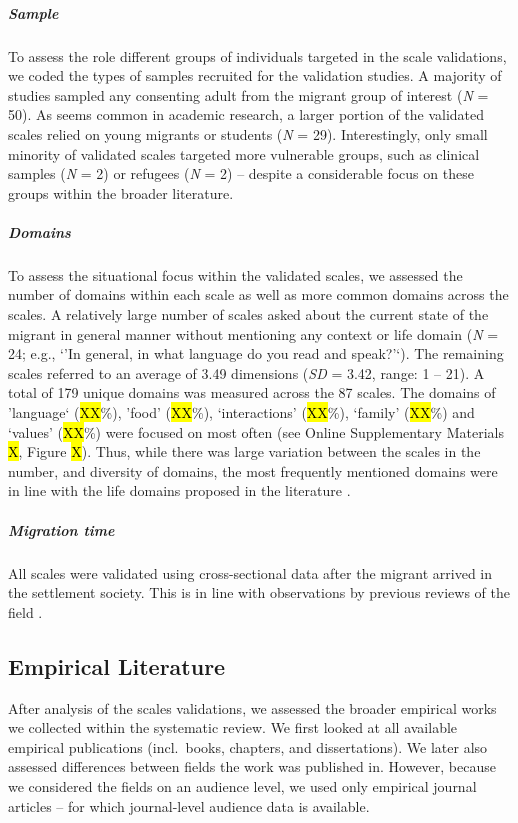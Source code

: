 \subparagraph{Sample}

To assess the role different groups of individuals targeted in the scale
validations, we coded the types of samples recruited for the validation
studies. A majority of studies sampled any consenting adult from the
migrant group of interest (\textit{N} = 50). As seems common in academic
research, a larger portion of the validated scales relied on young
migrants or students (\textit{N} = 29). Interestingly, only small
minority of validated scales targeted more vulnerable groups, such as
clinical samples (\textit{N} = 2) or refugees (\textit{N} = 2) --
despite a considerable focus on these groups within the broader
literature.

\subparagraph{Domains}

To assess the situational focus within the validated scales, we assessed
the number of domains within each scale as well as more common domains
across the scales. A relatively large number of scales asked about the
current state of the migrant in general manner without mentioning any
context or life domain (\textit{N} = 24; e.g., `'In general, in what
language do you read and speak?'`). The remaining scales referred to an
average of 3.49 dimensions (\textit{SD} = 3.42, range: 1 -- 21). A total
of 179 unique domains was measured across the 87 scales. The domains of
'language` (\hl{XX}\%), 'food' (\hl{XX}\%), `interactions' (\hl{XX}\%),
`family' (\hl{XX}\%) and `values' (\hl{XX}\%) were focused on most often
(see Online Supplementary Materials \hl{X}, Figure \hl{X}). Thus, while
there was large variation between the scales in the number, and
diversity of domains, the most frequently mentioned domains were in line
with the life domains proposed in the literature
\citep[e.g.,][]{Arends-Toth2007}.

\vspace{1em}

\subparagraph{Migration time}

All scales were validated using cross-sectional data after the migrant
arrived in the settlement society. This is in line with observations by
previous reviews of the field \citep[e.g.,][]{Brown2011}.

\subsection{Empirical Literature}

After analysis of the scales validations, we assessed the broader
empirical works we collected within the systematic review. We first
looked at all available empirical publications (incl.~books, chapters,
and dissertations). We later also assessed differences between fields
the work was published in. However, because we considered the fields on
an audience level, we used only empirical journal articles -- for which
journal-level audience data is available.

